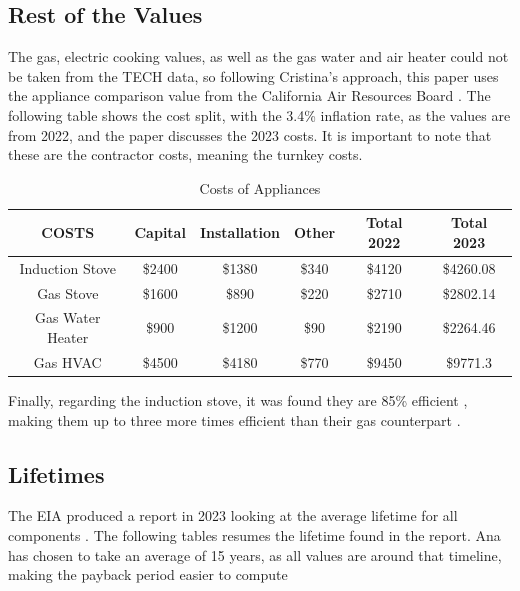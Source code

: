 \documentclass{article}
\begin{document}
\subsection{Rest of the Values}

The gas, electric cooking values, as well as the gas water and air heater could not be taken from the TECH data, so following Cristina's approach, this paper uses the appliance comparison value from the California Air Resources Board \cite{ApplianceCost}. The following table shows the cost split, with the 3.4\% inflation rate, as the values are from 2022, and the paper discusses the 2023 costs\cite{Inflation}. It is important to note that these are the contractor costs, meaning the turnkey costs.

\begin{table}[H]
    \centering
    \begin{tabular}{|c|c|c|c|c|c|}\hline
         COSTS&  Capital&  Installation&  Other&Total 2022 &Total 2023\\\hline
         Induction Stove&  \$2400&  \$1380&  \$340& \$4120&\$4260.08\\\hline
         Gas Stove&  \$1600&  \$890&  \$220& \$2710&\$2802.14\\\hline
         Gas Water Heater&  \$900&  \$1200&  \$90& \$2190&\$2264.46\\\hline
 Gas HVAC& \$4500& \$4180& \$770& \$9450&\$9771.3\\ \hline
    \end{tabular}
    \caption{Costs of Appliances}
    \label{ApplianceCosts}
\end{table}

Finally, regarding the induction stove, it was found they are 85\% efficient \cite{InductionEfficiency}, making them up to three more times efficient than their gas counterpart \cite{InductionEfficiencyvs}. 

\subsection{Lifetimes}

The EIA produced a report in 2023 looking at the average lifetime for all components \cite{EIALifetimes}. The following tables resumes the lifetime found in the report. Ana has chosen to take an average of 15 years, as all values are around that timeline, making the payback period easier to compute
\end{document}
